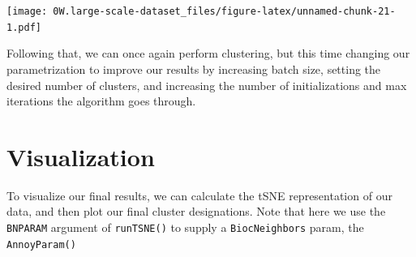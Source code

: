 \documentclass[]{book}
\newenvironment{Shaded}{\begin{snugshade}}{\end{snugshade}}
\newcommand{\CommentTok}[1]{\textcolor[rgb]{0.56,0.35,0.01}{\textit{#1}}}
\newcommand{\DataTypeTok}[1]{\textcolor[rgb]{0.13,0.29,0.53}{#1}}
\newcommand{\DecValTok}[1]{\textcolor[rgb]{0.00,0.00,0.81}{#1}}
\newcommand{\KeywordTok}[1]{\textcolor[rgb]{0.13,0.29,0.53}{\textbf{#1}}}
\newcommand{\NormalTok}[1]{#1}
\newcommand{\OperatorTok}[1]{\textcolor[rgb]{0.81,0.36,0.00}{\textbf{#1}}}
\newcommand{\StringTok}[1]{\textcolor[rgb]{0.31,0.60,0.02}{#1}}
\begin{document}
\texttt{[image: 0W.large-scale-dataset\_files/figure-latex/unnamed-chunk-21-1.pdf]}

Following that, we can once again perform clustering, but this time changing our parametrization to improve our results by increasing batch size, setting the desired number of clusters, and increasing the number of initializations and max iterations the algorithm goes through.

\begin{Shaded}
\end{Shaded}

\hypertarget{visualization}{%
\section{Visualization}\label{visualization}}

To visualize our final results, we can calculate the tSNE representation of our data, and then plot our final cluster designations. Note that here we use the \texttt{BNPARAM} argument of \texttt{runTSNE()} to supply a \texttt{BiocNeighbors} param, the \texttt{AnnoyParam()}
\end{document}
